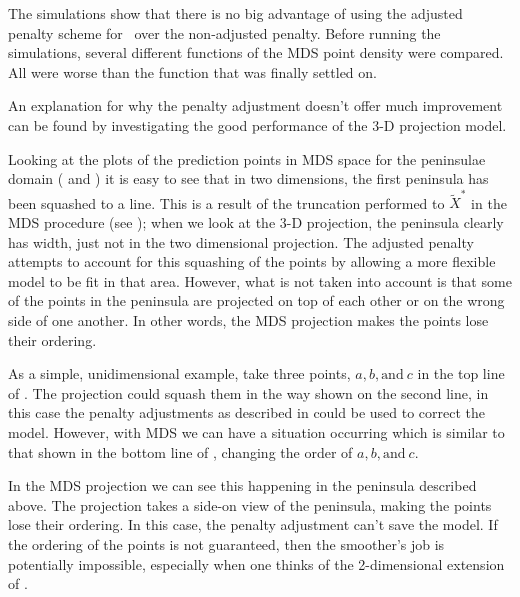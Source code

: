 {The simulations show that there is no big advantage of using the adjusted penalty scheme for \mdsap\ over the non-adjusted penalty. Before running the simulations, several different functions of the MDS point density were compared. All were worse than the function that was finally settled on.

An explanation for why the penalty adjustment doesn't offer much improvement can be found by investigating the good performance of the 3-D projection model. 

Looking at the plots of the prediction points in MDS space for the peninsulae domain ( and ) it is easy to see that in two dimensions, the first peninsula has been squashed to a line. This is a result of the truncation performed to $\tilde{X}^*$ in the MDS procedure (see ); when we look at the 3-D projection, the peninsula clearly has width, just not in the two dimensional projection. The adjusted penalty attempts to account for this squashing of the points by allowing a more flexible model to be fit in that area. However, what is not taken into account is that some of the points in the peninsula are projected on top of each other or on the wrong side of one another. In other words, the MDS projection makes the points lose their ordering. 

As a simple, unidimensional example, take three points, $a, b, \text{and}\ c$ in the top line of . The projection could squash them in the way shown on the second line, in this case the penalty adjustments as described in \cite{wood2000} could be used to correct the model. However, with MDS we can have a situation occurring which is similar to that shown in the bottom line of , changing the order of $a, b, \text{and}\ c$. 

In the MDS projection we can see this happening in the peninsula described above. The projection takes a side-on view of the peninsula, making the points lose their ordering. In this case, the penalty adjustment can't save the model. If the ordering of the points is not guaranteed, then the smoother's job is potentially impossible, especially when one thinks of the 2-dimensional extension of .

}
